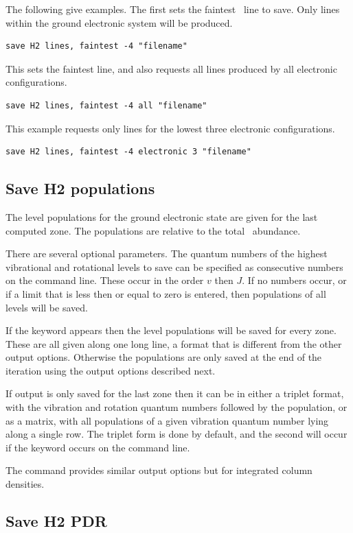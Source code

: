 The following give examples.  The first sets the faintest \htwo\ line to
save.  Only lines within the ground electronic system will be produced.
\begin{verbatim}
save H2 lines, faintest -4 "filename"
\end{verbatim}
This sets the faintest line, and also requests all lines produced by all
electronic configurations.
\begin{verbatim}
save H2 lines, faintest -4 all "filename"
\end{verbatim}
This example requests only lines for the lowest three electronic
configurations.
\begin{verbatim}
save H2 lines, faintest -4 electronic 3 "filename"
\end{verbatim}

\subsection{Save H2 populations}

The level populations for the ground electronic state are given for the
last computed zone.  The populations are relative to the total \htwo\ abundance.

There are several optional parameters.
The quantum numbers of the highest
vibrational and rotational levels to save can be specified as consecutive
numbers on the command line.
These occur in the order $v$ then $J$.
If no
numbers occur, or if a limit that is less then or equal to zero is entered,
then populations of all levels will be saved.

If the keyword  appears then the level populations 
will be saved for every zone.   These are all given along one long line,
a format that is different from the other output options.  Otherwise the
populations are only saved at the end of the iteration using the output
options described next.

If output is only saved for the last zone then it can be in either
a triplet format, with the vibration and rotation quantum numbers followed
by the population, or as a matrix, with all populations of a given vibration
quantum number lying along a single row.  The triplet form is done by
default, and the second will occur if the keyword
 occurs on the command line.

The  command provides similar output
options but for integrated column densities.

\subsection{Save H2 PDR}

